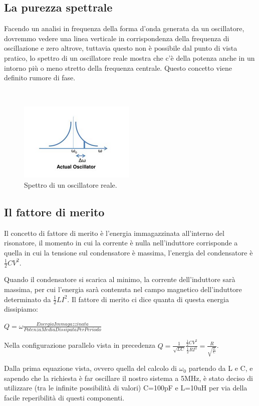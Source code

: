 \documentclass{article}
\begin{document}
\subsection{La purezza spettrale}
Facendo un analisi in frequenza della forma d'onda generata da un oscillatore, dovremmo vedere una linea verticale in corrispondenza della frequenza di oscillazione e zero altrove, tuttavia questo non è possibile dal punto di vista pratico, lo spettro di un oscillatore reale mostra che c'è della potenza anche in un intorno più o meno stretto della frequenza centrale.
Questo concetto viene definito rumore di fase.

~\begin{figure}[H]
\includegraphics[scale=2]{PhaseNoise.png} 
\centering
\caption{Spettro di un oscillatore reale.}
\label{fig:foo}
\end{figure}

\subsection{Il fattore di merito}
Il concetto di fattore di merito è l'energia immagazzinata all'interno del risonatore, il momento in cui la corrente è nulla nell'induttore corrisponde a quella in cui la tensione sul condensatore è massima, l'energia del condensatore è $\frac{1}{2}CV^2$.

Quando il condensatore si scarica al minimo, la corrente dell'induttore sarà massima, per cui l'energia sarà contenuta nel campo magnetico dell'induttore determinato da $\frac{1}{2}LI^2$.
Il fattore di merito ci dice quanta di questa energia dissipiamo:

$Q=\omega\frac{EnergiaImmagazzinata}{PotenzaMediaDissipataPerPeriodo}$
\centering

Nella configurazione parallelo vista in precedenza $Q=\frac{1}{\sqrt{LC}}\frac{\frac{1}{2}CV^2}{\frac{1}{2}RI^2}=\frac{R}{\sqrt{\frac{L}{C}}}$.

Dalla prima equazione vista, ovvero quella del calcolo di $\omega_0$ partendo da L e C, e sapendo che la richiesta è far oscillare il nostro sistema a 5MHz, è stato deciso di utilizzare (tra le infinite possibilità di valori) C=100pF e L=10uH per via della facile reperibilità di questi componenti.
\end{document}

